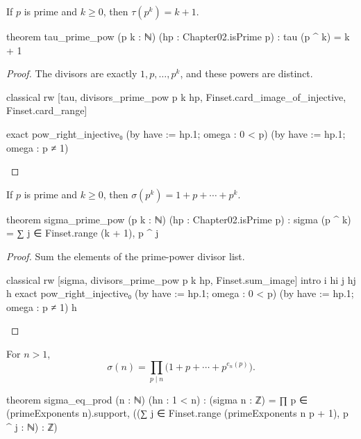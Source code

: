 \begin{theorem}
  \label{ent:thm:tau-prime-pow}
  If $p$ is prime and $k\ge0$, then $\tau(p^k)=k+1$.

  \begin{lean}
    theorem tau_prime_pow (p k : ℕ) (hp : Chapter02.isPrime p) : tau (p ^ k) = k + 1
  \end{lean}
\end{theorem}

\begin{proof}
  The divisors are exactly $1,p,\ldots,p^k$, and these powers are distinct.

  \begin{lean}
    classical
    rw [tau, divisors_prime_pow p k hp, Finset.card_image_of_injective,
      Finset.card_range]

    exact pow_right_injective₀ (by have := hp.1; omega : 0 < p) (by have := hp.1; omega : p ≠ 1)
  \end{lean}
\end{proof}

\begin{theorem}
  \label{ent:thm:sigma-prime-pow}
  If $p$ is prime and $k\ge0$, then $\sigma(p^k)=1+p+\cdots+p^k$.

  \begin{lean}
    theorem sigma_prime_pow (p k : ℕ) (hp : Chapter02.isPrime p) :
        sigma (p ^ k) = ∑ j ∈ Finset.range (k + 1), p ^ j
  \end{lean}
\end{theorem}

\begin{proof}
  Sum the elements of the prime-power divisor list.

  \begin{lean}
    classical
    rw [sigma, divisors_prime_pow p k hp, Finset.sum_image]
    intro i hi j hj h
    exact pow_right_injective₀ (by have := hp.1; omega : 0 < p) (by have := hp.1; omega : p ≠ 1) h
  \end{lean}
\end{proof}

\begin{theorem}
  \label{ent:thm:sigma-eq-prod}
  For $n>1$, \[ \sigma(n)=\prod_{p\mid n}\bigl(1+p+\cdots+p^{e_n(p)}\bigr). \]

  \begin{lean}
    theorem sigma_eq_prod (n : ℕ) (hn : 1 < n) :
        (sigma n : ℤ) = ∏ p ∈ (primeExponents n).support,
          ((∑ j ∈ Finset.range (primeExponents n p + 1), p ^ j : ℕ) : ℤ)
  \end{lean}
\end{theorem}

